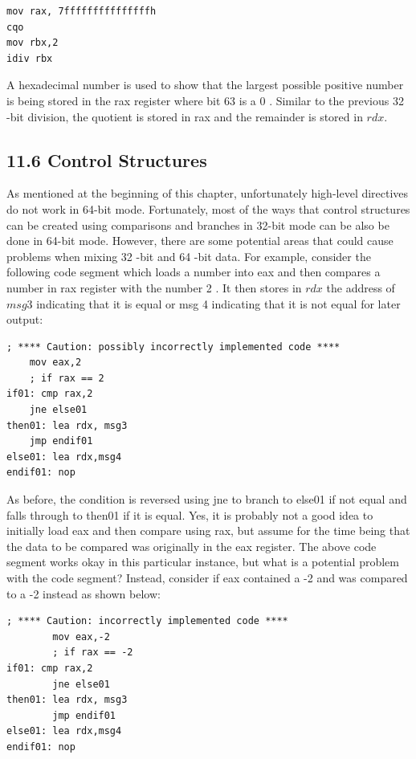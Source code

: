 \documentclass[10pt]{article}
\begin{document}
\begin{verbatim}
mov rax, 7fffffffffffffffh
cqo
mov rbx,2
idiv rbx
\end{verbatim}

A hexadecimal number is used to show that the largest possible positive number is being stored in the rax register where bit 63 is a 0 . Similar to the previous 32 -bit division, the quotient is stored in rax and the remainder is stored in $r d x$.

\subsection*{11.6 Control Structures}
As mentioned at the beginning of this chapter, unfortunately high-level directives do not work in 64-bit mode. Fortunately, most of the ways that control structures can be created using comparisons and branches in 32-bit mode can be also be done in 64-bit mode. However, there are some potential areas that could cause problems when mixing 32 -bit and 64 -bit data. For example, consider the following code segment which loads a number into eax and then compares a number in rax register with the number 2 . It then stores in $r d x$ the address of $m s g 3$ indicating that it is equal or msg 4 indicating that it is not equal for later output:

\begin{verbatim}
; **** Caution: possibly incorrectly implemented code ****
    mov eax,2
    ; if rax == 2
if01: cmp rax,2
    jne else01
then01: lea rdx, msg3
    jmp endif01
else01: lea rdx,msg4
endif01: nop
\end{verbatim}

As before, the condition is reversed using jne to branch to else01 if not equal and falls through to then01 if it is equal. Yes, it is probably not a good idea to initially load eax and then compare using rax, but assume for the time being that the data to be compared was originally in the eax register. The above code segment works okay in this particular instance, but what is a potential problem with the code segment? Instead, consider if eax contained a -2 and was compared to a -2 instead as shown below:

\begin{verbatim}
; **** Caution: incorrectly implemented code ****
        mov eax,-2
        ; if rax == -2
if01: cmp rax,2
        jne else01
then01: lea rdx, msg3
        jmp endif01
else01: lea rdx,msg4
endif01: nop
\end{verbatim}
\end{document}
